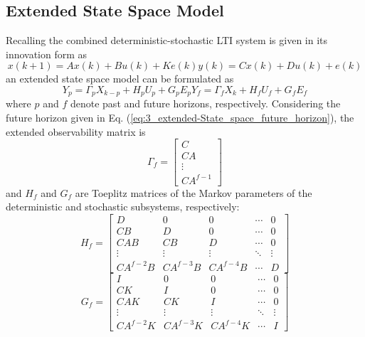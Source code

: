 \subsection{Extended State Space Model}\label{sec:extended_state_space_model}
Recalling the combined deterministic-stochastic LTI system is given in its innovation form as
\begin{subequations}
\begin{equation}x(k+1) = Ax(k) + Bu(k) + Ke(k)\end{equation}
\begin{equation}y(k) = Cx(k) + Du(k) + e(k)\end{equation}
\end{subequations}
an extended state space model can be formulated as
\begin{subequations}
\begin{equation}Y_p = \Gamma_p X_{k-p} + H_p U_p + G_p E_p\end{equation}
\begin{equation}Y_f = \Gamma_f X_k + H_f U_f + G_f E_f\label{eq:3_extended-State_space_future_horizon}\end{equation}
\end{subequations}
where $p$ and $f$ denote past and future horizons, respectively. Considering the future horizon given in Eq. (\ref{eq:3_extended-State_space_future_horizon}), the extended observability matrix is
\begin{equation*}
\Gamma_f = \begin{bmatrix}C\\ CA\\ \vdots\\ CA^{f-1}\end{bmatrix}
\end{equation*}
and $H_f$ and $G_f$ are Toeplitz matrices of the Markov parameters of the deterministic and stochastic subsystems, respectively:
\begin{equation*}
H_f = \begin{bmatrix}
D & 0 & 0 & \cdots & 0\\
CB & D & 0 & \cdots & 0\\
CAB & CB & D & \cdots & 0\\
\vdots & \vdots  & \vdots & \ddots & \vdots\\
CA^{f-2}B & CA^{f-3}B & CA^{f-4}B & \cdots & D
\end{bmatrix}
\end{equation*}
\begin{equation*}
G_f = \begin{bmatrix}
I & 0 & 0 & \cdots & 0\\
CK & I & 0 & \cdots & 0\\
CAK & CK & I & \cdots & 0\\
\vdots & \vdots  & \vdots & \ddots & \vdots\\
CA^{f-2}K & CA^{f-3}K & CA^{f-4}K & \cdots & I
\end{bmatrix}
\end{equation*}

